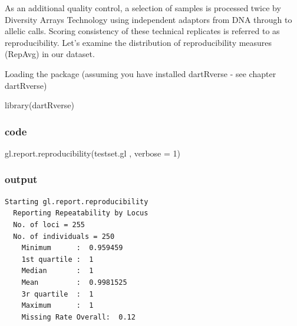 \documentclass[
  letterpaper,
  DIV=11,
  numbers=noendperiod]{scrreprt}
\newenvironment{Shaded}{\begin{snugshade}}{\end{snugshade}}
\newcommand{\AttributeTok}[1]{\textcolor[rgb]{0.49,0.56,0.16}{#1}}
\newcommand{\DecValTok}[1]{\textcolor[rgb]{0.25,0.63,0.44}{#1}}
\newcommand{\FunctionTok}[1]{\textcolor[rgb]{0.02,0.16,0.49}{#1}}
\newcommand{\NormalTok}[1]{\textcolor[rgb]{0.00,0.44,0.13}{#1}}
\let\textttOrig\texttt
\renewcommand{\texttt}[1]{\textttOrig{\color{blue}{#1}}}
\begin{document}
As an additional quality control, a selection of samples is processed
twice by Diversity Arrays Technology using independent adaptors from DNA
through to allelic calls. Scoring consistency of these technical
replicates is referred to as reproducibility. Let's examine the
distribution of reproducibility measures (RepAvg) in our dataset.

Loading the package (assuming you have installed dartRverse - see
chapter dartRverse)

\begin{Shaded}
\begin{Highlighting}[]
\FunctionTok{library}\NormalTok{(dartRverse)}
\end{Highlighting}
\end{Shaded}

\subsubsection{code}

\begin{Shaded}
\begin{Highlighting}[]
\FunctionTok{gl.report.reproducibility}\NormalTok{(testset.gl , }\AttributeTok{verbose =} \DecValTok{1}\NormalTok{)}
\end{Highlighting}
\end{Shaded}

\subsubsection{output}

\begin{verbatim}
Starting gl.report.reproducibility 
  Reporting Repeatability by Locus
  No. of loci = 255 
  No. of individuals = 250 
    Minimum      :  0.959459 
    1st quartile :  1 
    Median       :  1 
    Mean         :  0.9981525 
    3r quartile  :  1 
    Maximum      :  1 
    Missing Rate Overall:  0.12 
\end{verbatim}

\texttt{[image: basicfiltering\_files/figure-pdf/unnamed-chunk-3-1.pdf]}
\end{document}
